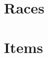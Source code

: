 \documentclass[10pt,twoside,twocolumn,openany,nodeprecatedcode]{dndbook}
\begin{document}
\frontmatter

\tableofcontents

\mainmatter%

\chapter{Races}





\chapter{Items}

\end{document}
